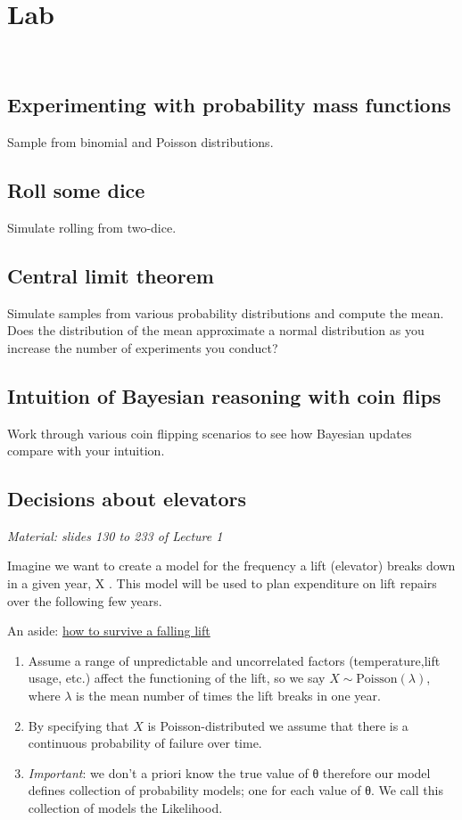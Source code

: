 \documentclass[]{article}
\begin{document}
\section{Lab}\

\subsection{Experimenting with probability mass functions}
Sample from binomial and Poisson distributions.

\subsection{Roll some dice}
Simulate rolling from two-dice.

\subsection{Central limit theorem}
Simulate samples from various probability distributions and compute the
mean. Does the distribution of the mean approximate a normal
distribution as you increase the number of experiments you conduct?

\subsection{Intuition of Bayesian reasoning with coin flips}
Work through various coin flipping scenarios to see how Bayesian updates
compare with your intuition.

\subsection{Decisions about elevators}
\emph{Material: slides 130 to 233 of Lecture 1}

Imagine we want to create a model for the frequency a lift (elevator)
breaks down in a given year, X . This model will be used to plan
expenditure on lift repairs over the following few years.

An aside:
\href{https://www.npr.org/sections/krulwich/2010/09/17/129934849/how-to-survive-when-your-elevator-plunges}{how
to survive a falling lift}

\begin{enumerate}
\item
  Assume a range of unpredictable and uncorrelated factors (temperature,lift usage, etc.) affect the functioning of the lift, so we say $X \sim \textrm{Poisson}(\lambda)$, where $\lambda$ is the mean number of times the lift breaks in one year.
\item
  By specifying that $X$ is Poisson-distributed we assume that there is a
  continuous probability of failure over time.
\item
  \emph{Important}: we don't a priori know the true value of θ therefore
  our model defines collection of probability models; one for each value
  of θ. We call this collection of models the Likelihood.
\end{enumerate}
\end{document}
